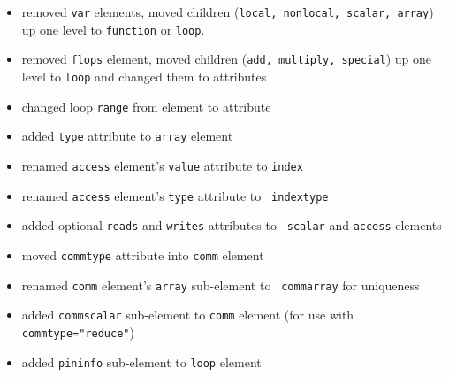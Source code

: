 \documentclass{article}
\begin{document}
\begin{itemize}
\item removed {\tt var} elements, moved children ({\tt local, nonlocal,
  scalar, array}) up one level to {\tt function} or {\tt loop}.
\item removed {\tt flops} element, moved children ({\tt add, multiply,
  special}) up one level to {\tt loop} and changed them to attributes
\item changed loop {\tt range} from element to attribute
\item added {\tt type} attribute to {\tt array} element
\item renamed {\tt access} element's {\tt value} attribute to {\tt index}
\item renamed {\tt access} element's {\tt type} attribute to {\tt
  indextype}
\item added optional {\tt reads} and {\tt writes} attributes to {\tt
  scalar} and {\tt access} elements
\item moved {\tt commtype} attribute into {\tt comm} element
\item renamed {\tt comm} element's {\tt array} sub-element to {\tt
  commarray} for uniqueness
\item added {\tt commscalar} sub-element to {\tt comm} element (for use
  with {\tt commtype="reduce"})
\item added {\tt pininfo} sub-element to {\tt loop} element
\end{itemize}
\end{document}
